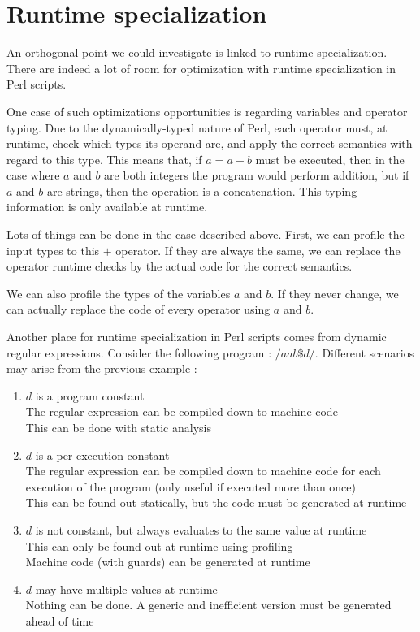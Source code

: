 \documentclass[11pt,a4paper]{report}
\begin{document}
\section{Runtime specialization}

An orthogonal point we could investigate is linked to runtime specialization. There are indeed a lot of room for optimization with runtime specialization in Perl scripts.

One case of such optimizations opportunities is regarding variables and operator typing. Due to the dynamically-typed nature of Perl, each operator must, at runtime, check which types its operand are, and apply the correct semantics with regard to this type. This means that, if $a = a + b$ must be executed, then in the case where $a$ and $b$ are both integers the program would perform addition, but if $a$ and $b$ are strings, then the operation is a concatenation. This typing information is only available at runtime.

Lots of things can be done in the case described above. First, we can profile the input types to this $+$ operator. If they are always the same, we can replace the operator runtime checks by the actual code for the correct semantics.

We can also profile the types of the variables $a$ and $b$. If they never change, we can actually replace the code of every operator using $a$ and $b$.

Another place for runtime specialization in Perl scripts comes from dynamic regular expressions. Consider the following program : $/aab\$d/$. Different scenarios may arise from the previous example :
\begin{enumerate}
\item $d$ is a program constant \\
The regular expression can be compiled down to machine code\\
This can be done with static analysis
\item $d$ is a per-execution constant \\
The regular expression can be compiled down to machine code for each execution of the program (only useful if executed more than once)\\
This can be found out statically, but the code must be generated at runtime
\item $d$ is not constant, but always evaluates to the same value at runtime \\
This can only be found out at runtime using profiling \\
Machine code (with guards) can be generated at runtime
\item $d$ may have multiple values at runtime \\
Nothing can be done. A generic and inefficient version must be generated ahead of time
\end{enumerate}
\end{document}
